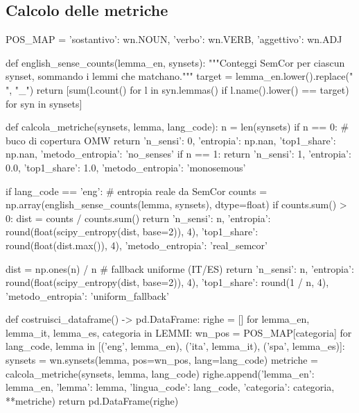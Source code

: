 \documentclass[12pt,a4paper]{article}
\begin{document}
\subsection{Calcolo delle metriche}

\begin{pylisting}[title={Estrazione dei synset (con filtro POS) e calcolo di entropia}]
POS_MAP = {'sostantivo': wn.NOUN, 'verbo': wn.VERB, 'aggettivo': wn.ADJ}

def english_sense_counts(lemma_en, synsets):
    """Conteggi SemCor per ciascun synset, sommando i lemmi che matchano."""
    target = lemma_en.lower().replace(" ", "_")
    return [sum(l.count() for l in syn.lemmas()
                if l.name().lower() == target) for syn in synsets]

def calcola_metriche(synsets, lemma, lang_code):
    n = len(synsets)
    if n == 0:                                    # buco di copertura OMW
        return {'n_sensi': 0, 'entropia': np.nan, 'top1_share': np.nan,
                'metodo_entropia': 'no_senses'}
    if n == 1:
        return {'n_sensi': 1, 'entropia': 0.0, 'top1_share': 1.0,
                'metodo_entropia': 'monosemous'}

    if lang_code == 'eng':                        # entropia reale da SemCor
        counts = np.array(english_sense_counts(lemma, synsets), dtype=float)
        if counts.sum() > 0:
            dist = counts / counts.sum()
            return {'n_sensi': n, 'entropia': round(float(scipy_entropy(dist, base=2)), 4),
                     'top1_share': round(float(dist.max()), 4),
                     'metodo_entropia': 'real_semcor'}

    dist = np.ones(n) / n                          # fallback uniforme (IT/ES)
    return {'n_sensi': n, 'entropia': round(float(scipy_entropy(dist, base=2)), 4),
            'top1_share': round(1 / n, 4), 'metodo_entropia': 'uniform_fallback'}

def costruisci_dataframe() -> pd.DataFrame:
    righe = []
    for lemma_en, lemma_it, lemma_es, categoria in LEMMI:
        wn_pos = POS_MAP[categoria]
        for lang_code, lemma in [('eng', lemma_en),
                                  ('ita', lemma_it), ('spa', lemma_es)]:
            synsets = wn.synsets(lemma, pos=wn_pos, lang=lang_code)
            metriche = calcola_metriche(synsets, lemma, lang_code)
            righe.append({'lemma_en': lemma_en, 'lemma': lemma,
                          'lingua_code': lang_code,
                          'categoria': categoria, **metriche})
    return pd.DataFrame(righe)
\end{pylisting}
\end{document}

